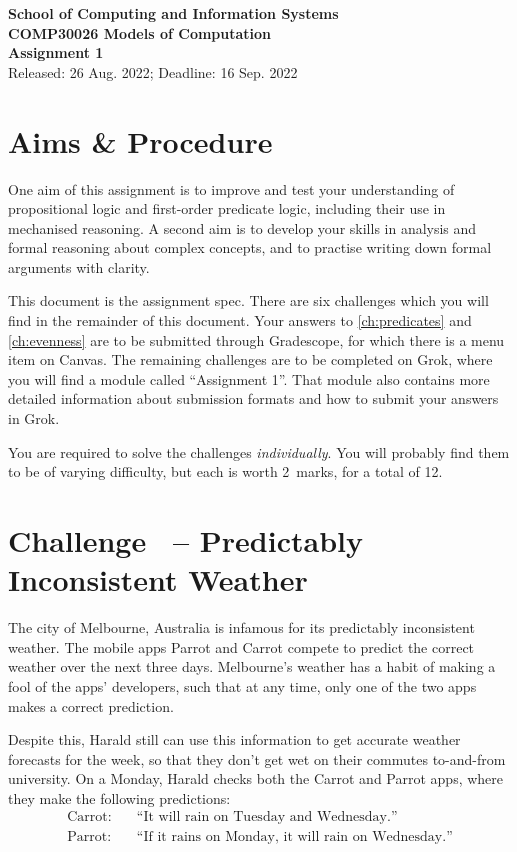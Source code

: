 \documentclass[11pt]{article}
\def\asg{1}
\newcounter{challenge}
\newcounter{task}
\renewcommand{\thechallenge}{Challenge~\arabic{challenge}}
\newcommand{\challenge}[1]{
    \setcounter{task}{0}
    \setcounter{equation}{0}
    \refstepcounter{challenge}
    \section*{\thechallenge{} -- #1}
}
\newcommand{\pdfchallenges}[0]{\ref{ch:predicates} and \ref{ch:evenness}}
\begin{document}
\begin{center}
    {\bf School of Computing and Information Systems \\ 
    COMP30026 Models of Computation}
    \bigskip \\
    {\Large\bf Assignment \asg}
    \bigskip \\
    {\large Released: 26 Aug. 2022; Deadline: 16 Sep. 2022}
\end{center}

\section*{Aims \& Procedure}

One aim of this assignment is to improve and test your understanding 
of propositional logic and first-order predicate logic,
including their use in mechanised reasoning.
A second aim is to develop your skills in analysis and 
formal reasoning about complex concepts,
and to practise writing down formal arguments with clarity.

This document is the assignment spec.
There are six challenges which you will find in the remainder of this document.
Your answers to \pdfchallenges{} are to be submitted through Gradescope,
for which there is a menu item on Canvas.
The remaining challenges are to be completed on Grok, 
where you will find a module called ``Assignment \asg''.
That module also contains more detailed information about 
submission formats and how to submit your answers in Grok. 

You are required to solve the challenges \emph{individually}.
You will probably find them to be of varying difficulty,
but each is worth 2~marks, for a total of 12.

\pagebreak

\challenge{Predictably Inconsistent Weather} \label{ch:logic-puzzle} 

\def\name{Harald}

The city of Melbourne, Australia is infamous for its predictably inconsistent weather.  
The mobile apps Parrot and Carrot compete to predict the correct weather over the next three days.  
Melbourne's weather has a habit of making a fool of the apps' developers, 
such that at any time, only one of the two apps makes a correct prediction.

Despite this, \name{} still can use this information to get accurate weather forecasts for the week, 
so that they don't get wet on their commutes to-and-from university.
On a Monday, \name{} checks both the Carrot and Parrot apps, where they make the following predictions:
\begin{align*}
    \text{Carrot:} &\quad \text{``It will rain on Tuesday and Wednesday.''}\\
    \text{Parrot:} &\quad \text{``If it rains on Monday, it will rain on Wednesday.''}
\end{align*}
\end{document}
